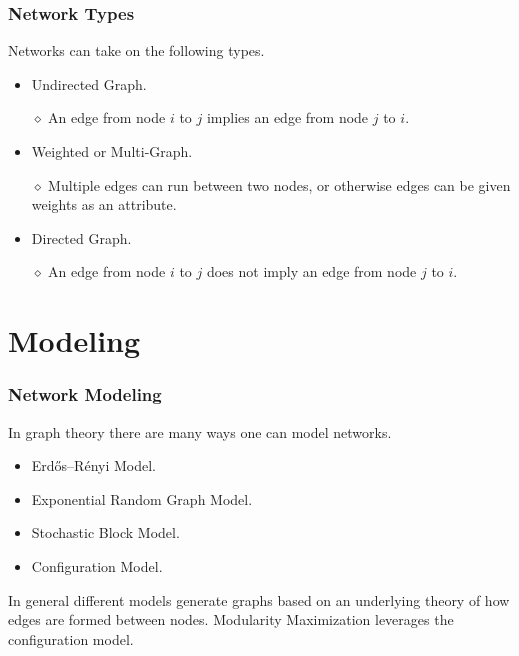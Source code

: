 \documentclass{beamer}
\begin{document}
\begin{frame}

    \frametitle{Network Types}

    Networks can take on the following types.\pause

    \vspace{2.5mm}
    \begin{itemize}
        \item Undirected Graph.\pause
        \item[$\diamond$] An edge from node $ i $ to $ j $ implies an edge from node $ j $ to $ i $.\pause
        \item Weighted or Multi-Graph.\pause
        \item[$\diamond$] Multiple edges can run between two nodes, or otherwise edges can be given weights as an attribute.\pause
        \item Directed Graph.\pause
        \item[$\diamond$] An edge from node $ i $ to $ j $ does not imply an edge from node $ j $ to $ i $.
    \end{itemize}

\end{frame}


\section{Modeling}

\begin{frame}

    \frametitle{Network Modeling}

    In graph theory there are many ways one can model networks.\pause

    \vspace{2.5mm}
    \begin{itemize}
        \item Erdős–Rényi Model.\pause
        \item Exponential Random Graph Model.\pause
        \item Stochastic Block Model.\pause
        \item Configuration Model.\pause
    \end{itemize}
    \vspace{2.5mm}

    In general different models generate graphs based on an underlying theory of how edges are formed between nodes. 
    Modularity Maximization leverages the configuration model. 

\end{frame}
\end{document}
